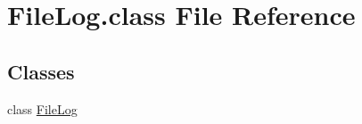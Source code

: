 \hypertarget{FileLog_8class}{\section{File\-Log.\-class File Reference}
\label{FileLog_8class}
}
\subsection*{Classes}
\begin{DoxyCompactItemize}
\item 
class \hyperlink{classFileLog}{File\-Log}
\end{DoxyCompactItemize}
